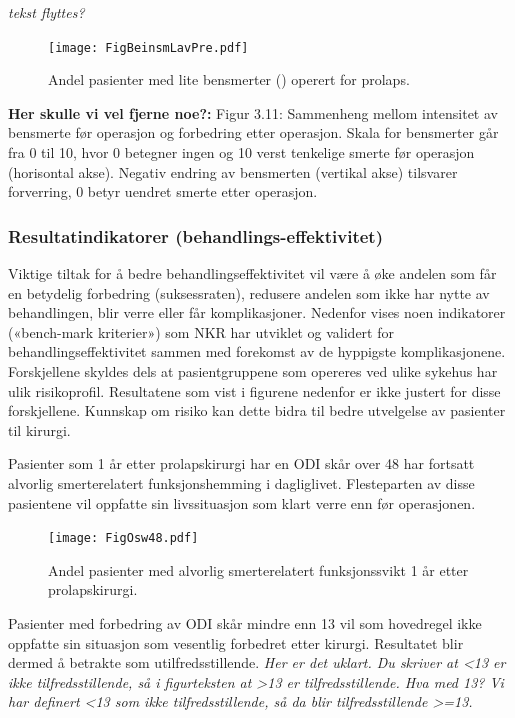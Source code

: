 \documentclass [norsk,a4paper,twoside]{article}\usepackage[]{graphicx}\usepackage[]{color}
\begin{document}
\textit{tekst flyttes?}

\begin{figure}[ht]
	\centering \texttt{[image: FigBeinsmLavPre.pdf]}
	\caption{\label{fig:BeinsmLavPre}  Andel pasienter med lite bensmerter () operert for prolaps.}
\end{figure}

\textbf{Her skulle vi vel fjerne noe?:}
Figur 3.11: Sammenheng mellom intensitet av bensmerte før operasjon og
forbedring etter operasjon. Skala for bensmerter går fra 0 til 10, hvor 0 betegner
ingen og 10 verst tenkelige smerte før operasjon (horisontal akse). Negativ endring
av bensmerten (vertikal akse) tilsvarer forverring, 0 betyr uendret smerte etter
operasjon.


\subsubsection{Resultatindikatorer (behandlings-effektivitet)}
Viktige tiltak for å bedre behandlingseffektivitet vil være å øke andelen som får en
betydelig forbedring (suksessraten), redusere andelen som ikke har nytte av
behandlingen, blir verre eller får komplikasjoner. Nedenfor vises noen indikatorer
(«bench-mark kriterier») som NKR har utviklet og validert for
behandlingseffektivitet sammen med forekomst av de hyppigste komplikasjonene.
Forskjellene skyldes dels at pasientgruppene som opereres ved ulike sykehus har
ulik risikoprofil. Resultatene som vist i figurene nedenfor er ikke justert for disse
forskjellene. Kunnskap om risiko kan dette bidra til bedre utvelgelse av pasienter til
kirurgi.




Pasienter som 1 år etter prolapskirurgi har en ODI skår over 48 har fortsatt alvorlig
smerterelatert funksjonshemming i dagliglivet. Flesteparten av disse pasientene vil
oppfatte sin livssituasjon som klart verre enn før operasjonen.
\begin{figure}[ht]
	\centering \texttt{[image: FigOsw48.pdf]}
	\caption{\label{fig:Osw48}  Andel pasienter med alvorlig smerterelatert funksjonssvikt 1 år etter
prolapskirurgi.}
\end{figure}



Pasienter med forbedring av ODI skår mindre enn 13 vil som hovedregel ikke
oppfatte sin situasjon som vesentlig forbedret etter kirurgi. Resultatet blir dermed å
betrakte som utilfredsstillende. \textit{Her er det uklart. Du skriver at <13 er ikke tilfredsstillende, så i figurteksten at >13 er tilfredsstillende. Hva med 13? Vi har definert <13 som ikke tilfredsstillende, så da blir tilfredsstillende >=13.}
\end{document}
